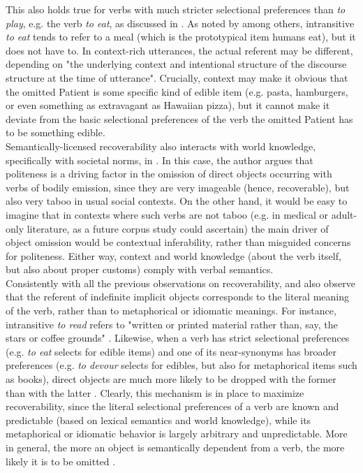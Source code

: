 This also holds true for verbs with much stricter selectional preferences than \textit{to play}, e.g. the verb \textit{to eat}, as discussed in . As noted by \textcite[149]{Cote1996} among others, intransitive \textit{to eat} tends to refer to a meal (which is the prototypical item humans eat), but it does not have to. In context-rich utterances, the actual referent may be different, depending on "the underlying context and intentional structure of the discourse structure at the time of utterance". Crucially, context may make it obvious that the omitted Patient is some specific kind of edible item (e.g. pasta, hamburgers, or even something as extravagant as Hawaiian pizza), but it cannot make it deviate from the basic selectional preferences of the verb \textemdash the omitted Patient has to be something edible.\\
Semantically-licensed recoverability also interacts with world knowledge, specifically with societal norms, in \textcite{Goldberg2005}. In this case, the author argues that politeness is a driving factor in the omission of direct objects occurring with verbs of bodily emission, since they are very imageable (hence, recoverable), but also very taboo in usual social contexts. On the other hand, it would be easy to imagine that in contexts where such verbs are not taboo (e.g. in medical or adult-only literature, as a future corpus study could ascertain) the main driver of object omission would be contextual inferability, rather than misguided concerns for politeness. Either way, context and world knowledge (about the verb itself, but also about proper customs) comply with verbal semantics.\\
Consistently with all the previous observations on recoverability, \textcite{Mittwoch2005} and \textcite{Glass2013} also observe that the referent of indefinite implicit objects corresponds to the literal meaning of the verb, rather than to metaphorical or idiomatic meanings. For instance, intransitive \textit{to read} refers to "written or printed material rather than, say, the stars or coffee grounds" \parencite[2]{Mittwoch2005}. Likewise, when a verb has strict selectional preferences (e.g. \textit{to eat} selects for edible items) and one of its near-synonyms has broader preferences (e.g. \textit{to devour} selects for edibles, but also for metaphorical items such as books), direct objects are much more likely to be dropped with the former than with the latter \parencite[5]{Glass2013}. Clearly, this mechanism is in place to maximize recoverability, since the literal selectional preferences of a verb are known and predictable (based on lexical semantics and world knowledge), while its metaphorical or idiomatic behavior is largely arbitrary and unpredictable. More in general, the more an object is semantically dependent from a verb, the more likely it is to be omitted \parencite[203-204]{Rice1988}.


